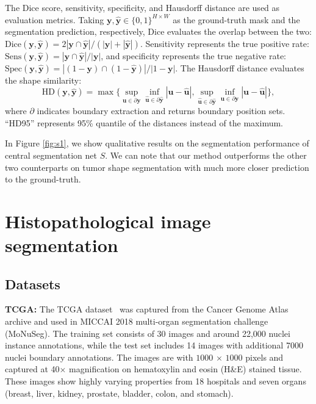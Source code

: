 \documentclass[letterpaper]{article} %
\begin{document}
The Dice score, sensitivity, specificity, and Hausdorff distance are used as evaluation metrics. Taking $\bm{y}, \hat{\bm{y}} \in \{0,1 \}^{H \times W}$ as the ground-truth mask and the segmentation prediction, respectively, Dice evaluates the overlap between the two: $\text{Dice}(\bm{y}, \hat{\bm{y}}) = {2|\bm{y} \cap \hat{\bm{y}} |} / {(|\bm{y}|+|\hat{\bm{y}}|)}$. Sensitivity represents the true positive rate: $\text{Sens}(\bm{y}, \hat{\bm{y}}) = {|\bm{y} \cap \hat{\bm{y}} |} / {|\bm{y}|}$, and specificity represents the true negative rate: $\text{Spec}(\bm{y}, \hat{\bm{y}}) = {|(1-\bm{y}) \cap (1-\hat{\bm{y}}) |} / {|1-\bm{y}|}$. The Hausdorff distance evaluates the shape similarity: 
\begin{equation}
\label{eq:hausdorff}
    \text{HD}(\bm{y},\hat{\bm{y}}) = \max \{\sup_{\bm{u} \in \partial{\bm{y}}} \inf_{\bm{\hat{u}} \in \partial{\bm{\hat{y}}}}  |\bm{u}-\hat{\bm{u}}|, \sup_{\bm{\hat{u}}\in \partial{\bm{\hat{y}}}} \inf_{\bm{u} \in \partial{\bm{y}}}    |\bm{u}-\hat{\bm{u}}| \},
\end{equation}
where $\partial$ indicates boundary extraction and returns boundary position sets. ``HD95'' represents 95\% quantile of the distances instead of the maximum.

In Figure \ref{fig:s1}, we show qualitative results on the segmentation performance of central segmentation net $S$. We can note that our method outperforms the other two counterparts \cite{mcmahan2017communication, chang2020synthetic} on tumor shape segmentation with much more closer prediction to the ground-truth. 


\section{Histopathological image segmentation}
\subsection{Datasets}
\textbf{TCGA:} 
The TCGA dataset~\cite{kumar2017dataset}  was captured from the Cancer Genome Atlas  archive and used in MICCAI 2018 multi-organ segmentation challenge (MoNuSeg). The training set consists of 30 images and around 22,000 nuclei instance annotations, while the test set includes 14 images with additional 7000 nuclei boundary annotations. The images are with $1000$ $\times$ $1000$ pixels and captured at 40$\times$  magnification on hematoxylin and eosin (H\&E) stained tissue. These images show highly varying properties from 18 hospitals and seven organs (breast, liver, kidney, prostate, bladder, colon, and stomach).  
\end{document}

